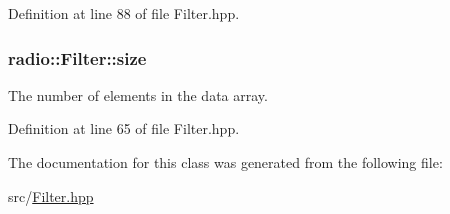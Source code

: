 Definition at line 88 of file Filter.\+hpp.

\hypertarget{classradio_1_1Filter_a7285b4c7263d8278e38abb14b5dca5d9}{
\subsubsection[{size}]{ radio\+::\+Filter\+::size\hspace{0.3cm}{\ttfamily [protected]}}}\label{classradio_1_1Filter_a7285b4c7263d8278e38abb14b5dca5d9}
The number of elements in the data array. 

Definition at line 65 of file Filter.\+hpp.



The documentation for this class was generated from the following file\+:\begin{DoxyCompactItemize}
\item 
src/\hyperlink{Filter_8hpp}{Filter.\+hpp}\end{DoxyCompactItemize}
